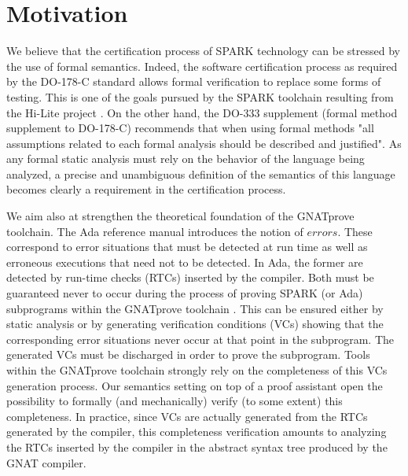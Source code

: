 \section{Motivation}
We believe that the certification process of SPARK technology can be
stressed by the use of formal semantics.
Indeed, the software certification process as required by the DO-178-C \cite{RTCA:DO-178} 
standard allows formal verification to replace some forms of testing. 
This is one of the goals pursued by the SPARK toolchain resulting from 
the Hi-Lite project \cite{Hi-Lite:URL}. On the other hand, the DO-333 
supplement \cite{RTCA:DO-333} (formal method supplement to DO-178-C) recommends that 
when using formal methods "all assumptions related to each formal 
analysis should be described and justified". As any formal static 
analysis must rely on the behavior of the language being analyzed, a 
precise and unambiguous definition of the semantics of this language 
becomes clearly a requirement in the certification process.

We  aim also at strengthen the theoretical foundation of the GNATprove
toolchain.
The Ada reference manual \cite{Ada:URL} introduces the notion of $\mathit{errors}$.
These correspond to error situations that must be detected 
at run time as well as erroneous executions that need not to be 
detected. In Ada, the former are detected by run-time checks 
(RTCs) inserted by the compiler. Both must be guaranteed never to
occur during the process of proving SPARK (or Ada) subprograms within
the GNATprove toolchain \cite{Gnatprove:URL}. This can be ensured either by static
analysis or by generating verification conditions (VCs) showing that 
the corresponding error situations never occur at that point in the 
subprogram. The generated VCs must be discharged in order to prove the 
subprogram.  Tools within the GNATprove toolchain strongly rely on the 
completeness of this VCs generation process. Our semantics setting on 
top of a proof assistant open the possibility to formally (and 
mechanically) verify (to some extent) this completeness. In practice, 
since VCs are actually generated from the RTCs generated by the 
compiler, this completeness verification amounts to analyzing the RTCs 
inserted by the compiler in the abstract syntax tree produced by the 
GNAT compiler.

